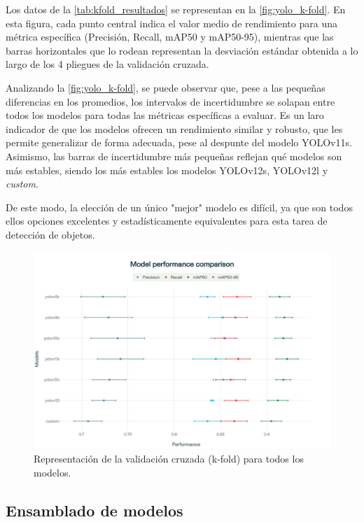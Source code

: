 \documentclass[12pt,a4paper,onecolumn,oneside]{report}
\begin{document}
Los datos de la \autoref{tab:kfold_resultados} se representan en la \autoref{fig:yolo_k-fold}.
En esta figura, cada punto central indica el valor medio de rendimiento para una métrica específica (Precisión, Recall, mAP50 y mAP50-95), 
mientras que las barras horizontales que lo rodean representan la desviación estándar obtenida a lo largo de los 4 pliegues de la validación cruzada.

Analizando la \autoref{fig:yolo_k-fold}, se puede observar que, pese a las pequeñas diferencias en los promedios, los intervalos de incertidumbre se solapan entre todos los modelos
para todas las métricas específicas a evaluar. Es un laro indicador de que los modelos ofrecen un rendimiento similar y robusto, que les permite generalizar de forma adecuada, pese al despunte del modelo YOLOv11s. 
Asimismo, las barras de incertidumbre más pequeñas reflejan qué modelos son más estables, siendo los más estables los modelos YOLOv12s, YOLOv12l y \textit{custom}.

De este modo, la elección de un único "mejor" modelo es difícil, ya que son todos ellos opciones excelentes y estadísticamente equivalentes para esta tarea de detección de objetos. 

\begin{figure}[H]
  \centering
  \includegraphics[width=1.0\textwidth]{figuras/k-fold/Yolo_k-fold.png}
  \caption{Representación de la validación cruzada (k-fold) para todos los modelos.}
  \label{fig:yolo_k-fold}
\end{figure}

\subsection{Ensamblado de modelos}
\label{sec:Ensamblado de modelos}
\end{document}
